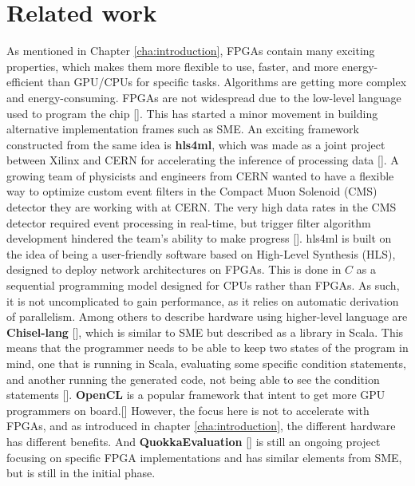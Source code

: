 \newpage


\section{Related work}
As mentioned in Chapter \ref{cha:introduction}, FPGAs contain many exciting properties, which makes them more flexible to use, faster, and more energy-efficient than GPU/CPUs for specific tasks. Algorithms are getting more complex and energy-consuming.
FPGAs are not widespread due to the low-level language used to program the chip [\cite{fang2020memory}]. This has started a minor movement in building alternative implementation frames such as SME.
An exciting framework constructed from the same idea is \textbf{hls4ml}, which was made as a joint project between Xilinx and CERN for accelerating the inference of processing data [\cite{hls4ml}]. A growing team of physicists and engineers from CERN wanted to have a flexible way to optimize custom event filters in the Compact Muon Solenoid (CMS) detector they are working with at CERN. The very high data rates in the CMS detector required event processing in real-time, but trigger filter algorithm development hindered the team’s ability to make progress [\cite{fahim2021hls4ml}].
hls4ml is built on the idea of being a user-friendly software based on High-Level Synthesis (HLS), designed to deploy network architectures on FPGAs. This is done in $C$ as a sequential programming model designed for CPUs rather than FPGAs. As such, it is not uncomplicated to gain performance, as it relies on automatic derivation of parallelism.
Among others to describe hardware using higher-level language are \textbf{Chisel-lang} [\cite{chisel-lang}], which is similar to SME but described as a library in Scala. This means that the programmer needs to be able to keep two states of the program in mind, one that is running in Scala, evaluating some specific condition statements, and another running the generated code, not being able to see the condition statements [\cite{SME2020}].
\textbf{OpenCL }is a popular framework that intent to get more GPU programmers on board.[\cite{OpenCL}]
However, the focus here is not to accelerate with FPGAs, and as introduced in chapter \ref{cha:introduction}, the different hardware has different benefits.
And \textbf{QuokkaEvaluation} [\cite{QuokkaEvaluation}] is still an ongoing project focusing on specific FPGA implementations and has similar elements from SME, but is still in the initial phase.

